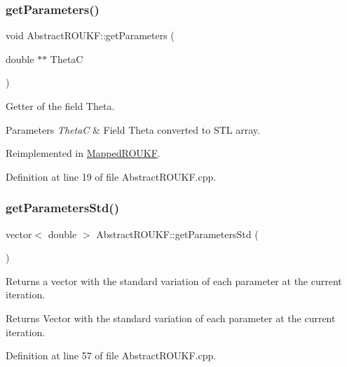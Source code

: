 \subsubsection{\texorpdfstring{get\+Parameters()}{getParameters()}}
{\footnotesize\ttfamily void Abstract\+R\+O\+U\+K\+F\+::get\+Parameters (\begin{DoxyParamCaption}\item[{double $\ast$$\ast$}]{ThetaC }\end{DoxyParamCaption})\hspace{0.3cm}{\ttfamily [virtual]}}

Getter of the field {\ttfamily Theta}. 
\begin{DoxyParams}{Parameters}
{\em ThetaC} & Field {\ttfamily Theta} converted to S\+TL array. \\
\hline
\end{DoxyParams}


Reimplemented in \mbox{\hyperlink{classMappedROUKF_aa6670e2cc9899b93b71db3f238ae93f3}{Mapped\+R\+O\+U\+KF}}.



Definition at line 19 of file Abstract\+R\+O\+U\+K\+F.\+cpp.

\mbox{\label{classAbstractROUKF_a210b89fa43dd6c6f658518d24dcc9c9c}} 
\subsubsection{\texorpdfstring{get\+Parameters\+Std()}{getParametersStd()}}
{\footnotesize\ttfamily vector$<$ double $>$ Abstract\+R\+O\+U\+K\+F\+::get\+Parameters\+Std (\begin{DoxyParamCaption}{ }\end{DoxyParamCaption})}

Returns a vector with the standard variation of each parameter at the current iteration. \begin{DoxyReturn}{Returns}
Vector with the standard variation of each parameter at the current iteration. 
\end{DoxyReturn}


Definition at line 57 of file Abstract\+R\+O\+U\+K\+F.\+cpp.

\mbox{\label{classAbstractROUKF_ad24dafa1f4cb02a38958264740588b87}} 

